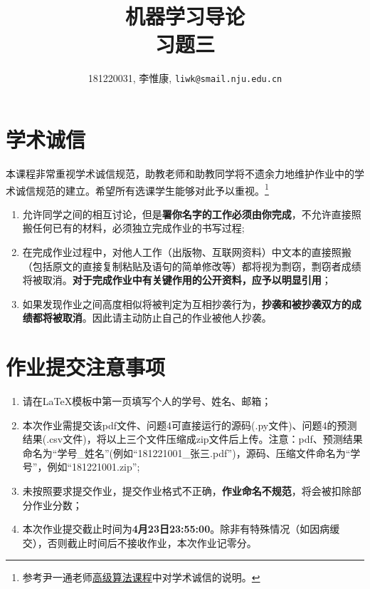 \documentclass[a4paper,UTF8]{article}
\theoremstyle{definition}
\begin{document}
\title{机器学习导论\\习题三}
\author{181220031, 李惟康, \texttt{liwk@smail.nju.edu.cn}}
\maketitle


\section*{学术诚信}

本课程非常重视学术诚信规范，助教老师和助教同学将不遗余力地维护作业中的学术诚信规范的建立。希望所有选课学生能够对此予以重视。\footnote{参考尹一通老师\href{http://tcs.nju.edu.cn/wiki/}{高级算法课程}中对学术诚信的说明。}

\begin{tcolorbox}
	\begin{enumerate}
		\item[(1)] 允许同学之间的相互讨论，但是{\color{red}\textbf{署你名字的工作必须由你完成}}，不允许直接照搬任何已有的材料，必须独立完成作业的书写过程;
		\item[(2)] 在完成作业过程中，对他人工作（出版物、互联网资料）中文本的直接照搬（包括原文的直接复制粘贴及语句的简单修改等）都将视为剽窃，剽窃者成绩将被取消。{\color{red}\textbf{对于完成作业中有关键作用的公开资料，应予以明显引用}}；
		\item[(3)] 如果发现作业之间高度相似将被判定为互相抄袭行为，{\color{red}\textbf{抄袭和被抄袭双方的成绩都将被取消}}。因此请主动防止自己的作业被他人抄袭。
	\end{enumerate}
\end{tcolorbox}

\section*{作业提交注意事项}
\begin{tcolorbox}
	\begin{enumerate}
		\item[(1)] 请在LaTeX模板中第一页填写个人的学号、姓名、邮箱；
		\item[(2)] 本次作业需提交该pdf文件、问题4可直接运行的源码(.py文件)、问题4的预测结果(.csv文件)，将以上三个文件压缩成zip文件后上传。注意：pdf、预测结果命名为“学号\_姓名”(例如“181221001\_张三.pdf”)，源码、压缩文件命名为“学号”，例如“181221001.zip”;
		\item[(3)] 未按照要求提交作业，提交作业格式不正确，{\color{red}\textbf{作业命名不规范}}，将会被扣除部分作业分数；
		\item[(4)] 本次作业提交截止时间为{\color{red}\textbf{4月23日23:55:00}}。除非有特殊情况（如因病缓交），否则截止时间后不接收作业，本次作业记零分。
	\end{enumerate}
\end{tcolorbox}
\end{document}
